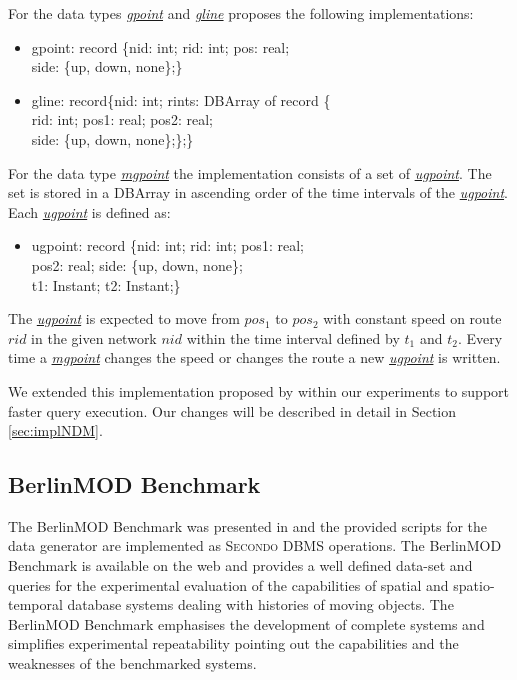 \documentclass[a4paper]{article}
\newcommand{\secondo}{\textsc{Secondo}}
\newcommand{\bmodb} {BerlinMOD Benchmark}
\newcommand{\dt}[1]{\textsl{\underline{#1}}}
\begin{document}
For the data types \dt{gpoint} and \dt{gline} \cite{NetworkGueting} proposes
the following implementations:
\begin{ttfamily}
\begin{itemize}
  \item [] gpoint: record \{nid: int; rid: int; pos: real;\\
side: \{up, down, none\};\}
  \item [] gline: record\{nid: int; rints: DBArray of record \{\\
rid: int; pos1: real; pos2: real;\\
side: \{up, down, none\};\};\}
\end{itemize}
\end{ttfamily}
For the data type \dt{mgpoint} the implementation consists of a set of
\dt{ugpoint}.
The set is stored in a DBArray in ascending order of the time intervals of the
\dt{ugpoint}. Each \dt{ugpoint} is defined as:
\begin{ttfamily}
\begin{itemize}
  \item [] ugpoint: record \{nid: int; rid: int; pos1: real;\\
pos2: real; side: \{up, down, none\};\\
t1: Instant; t2: Instant;\}
\end{itemize}
\end{ttfamily}
The \dt{ugpoint} is expected to move from $pos_1$ to $pos_2$ with constant speed
on
route $rid$ in the given network $nid$ within the time interval defined by $t_1$
and $t_2$. Every time a \dt{mgpoint} changes the speed or changes the route a
new
\dt{ugpoint} is written.

We extended this implementation proposed by \cite{NetworkGueting} within our
experiments to support faster query execution. Our changes will be described in
detail in Section \ref{sec:implNDM}.
\subsection{BerlinMOD Benchmark}
\label{sec:bmodb}
The \bmodb{} was presented in \cite{BerlinMODVLDBDuentgen} and the
provided scripts for the data generator are implemented as \secondo{} DBMS
operations.
The \bmodb{} is available on the web \cite{berlinmodweb} and provides a well
defined
data-set and queries for the experimental evaluation of the capabilities of
spatial and spatio-temporal database systems dealing with histories of moving
objects. The \bmodb{} emphasises the development of complete systems
and simplifies experimental repeatability pointing out the capabilities and the
weaknesses of the benchmarked systems.
\end{document}
